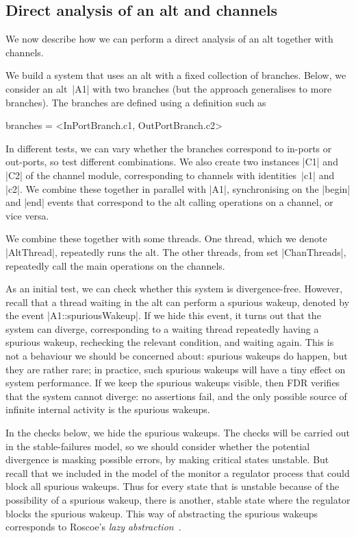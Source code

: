 \subsection{Direct analysis of an alt and channels}
\label{sec:combined}

\inlineCSP

We now describe how we can perform a direct analysis of an alt together with
channels.  

We build a system that uses an alt with a fixed collection of branches.
Below, we consider an alt~|A1| with two branches (but the approach generalises
to more branches).  The branches are defined using a definition such as
%
\begin{cspm}
branches =  <InPortBranch.c1, OutPortBranch.c2>
\end{cspm}
%
In different tests, we can vary whether the branches correspond to in-ports or
out-ports, so test different combinations.  We also create two instances |C1|
and |C2| of the channel module, corresponding to channels with
identities~|c1| and |c2|.  We combine these together in parallel with |A1|,
synchronising on the |begin| and |end| events that correspond to the alt
calling operations on a channel, or vice versa.

We combine these together with some threads.  One thread, which we denote
|AltThread|, repeatedly runs the alt.  The other threads, from set
|ChanThreads|, repeatedly call the main operations on the channels.

As an initial test, we can check whether this system is divergence-free.
However, recall that a thread waiting in the alt can perform a spurious
wakeup, denoted by the event |A1::spuriousWakeup|.  If we hide this event, it
turns out that the system can diverge, corresponding to a waiting thread
repeatedly having a spurious wakeup, rechecking the relevant condition, and
waiting again.  This is not a behaviour we should be concerned about: spurious
wakeups do happen, but they are rather rare; in practice, such spurious
wakeups will have a tiny effect on system performance.  If we keep the
spurious wakeups visible, then FDR verifies that the system cannot diverge: no
assertions fail, and the only possible source of infinite internal activity is
the spurious wakeups.

In the checks below, we hide the spurious wakeups.  The checks will be carried
out in the stable-failures model, so we should consider whether the potential
divergence is masking possible errors, by making critical states unstable.
But recall that we included in the model of the monitor a regulator process
that could block all spurious wakeups.  Thus for every state that is unstable
because of the possibility of a spurious wakeup, there is another, stable
state where the regulator blocks the spurious wakeup.  This way of abstracting
the spurious wakeups corresponds to Roscoe's \emph{lazy
  abstraction}~\cite{awr:UCS}. 

